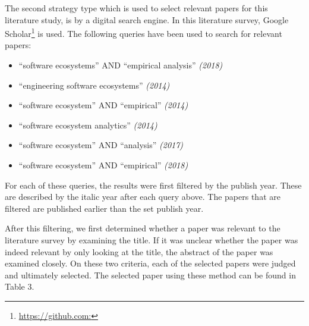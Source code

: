 \documentclass[]{book}
\providecommand{\tightlist}{%
  \setlength{\itemsep}{0pt}\setlength{\parskip}{0pt}}
\let\rmarkdownfootnote\footnote%
\def\footnote{\protect\rmarkdownfootnote}
\begin{document}
The second strategy type which is used to select relevant papers for
this literature study, is by a digital search engine. In this literature
survey, Google Scholar\footnote{\url{https://github.com:}} is used. The
following queries have been used to search for relevant papers:

\begin{itemize}
\tightlist
\item
  ``software ecosystems'' AND ``empirical analysis'' \emph{(2018)}
\item
  ``engineering software ecosystems'' \emph{(2014)}
\item
  ``software ecosystem'' AND ``empirical'' \emph{(2014)}
\item
  ``software ecosystem analytics'' \emph{(2014)}
\item
  ``software ecosystem'' AND ``analysis'' \emph{(2017)}
\item
  ``software ecosystem'' AND ``empirical'' \emph{(2018)}
\end{itemize}

For each of these queries, the results were first filtered by the
publish year. These are described by the italic year after each query
above. The papers that are filtered are published earlier than the set
publish year.

After this filtering, we first determined whether a paper was relevant
to the literature survey by examining the title. If it was unclear
whether the paper was indeed relevant by only looking at the title, the
abstract of the paper was examined closely. On these two criteria, each
of the selected papers were judged and ultimately selected. The selected
paper using these method can be found in Table 3.
\end{document}
